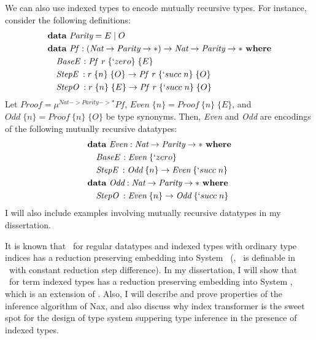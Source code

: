 We can also use indexed types to encode mutually recursive types.
For instance, consider the following definitions:
\begin{align*}
&\textbf{data}~ \textit{Parity} = E \mid O \\
&\textbf{data}~ \textit{Pf}\, : (\textit{Nat} -> \textit{Parity} -> *) ->
                                    \textit{Nat} -> \textit{Parity} -> *
  ~\textbf{where}\\
&\quad \textit{BaseE}\, : \textit{Pf}~\,r\;\{`zero\}\;\{E\} \\
&\quad \textit{StepE}\; : r\;\{n\}\;\{O\} -> \textit{Pf}~\,r\;\{`succ\;n\}\;\{O\} \\
&\quad \textit{StepO}\; : r\;\{n\}\;\{E\} -> \textit{Pf}~\,r\;\{`succ\;n\}\;\{O\}
\end{align*}
Let $\textit{Proof} = \mu^{\textit{Nat} -> \textit{Parity} -> *} \textit{Pf}$,
$\textit{Even}\;\{n\} = \textit{Proof}~\{n\}\;\{E\}$, and
$\textit{Odd}\;\{n\} = \textit{Proof}~\{n\}\;\{O\}$ be type synonyms.
Then, \textit{Even} and \textit{Odd} are encodings of the following
mutually recursive datatypes:
\begin{align*}
&\textbf{data}~\textit{Even} : \textit{Nat} -> \textit{Parity} -> *
 ~\textbf{where} \\
&\quad \textit{BaseE}\, : \textit{Even}\;\{`zero\}\\
&\quad \textit{StepE}\; : \textit{Odd}\;\{n\} -> \textit{Even}\;\{`succ\;n\} \\
&\textbf{data}~\textit{Odd} : \textit{Nat} -> \textit{Parity} -> *
 ~\textbf{where} \\
&\quad \textit{StepO}\; : \textit{Even}\;\{n\} -> \textit{Odd}\;\{`succ\;n\}
\end{align*}
I will also include examples involving mutually recursive datatypes
in my dissertation.

It is known that \MIt\ for regular datatypes and indexed types with ordinary
type indices has a reduction preserving embedding into System \Fw\ (\ie, \MIt\
is definable in \Fw\ with constant reduction step difference).
In my dissertation, I will show that \MIt\ for term indexed types has a
reduction preserving embedding into System \Fi, which is an extension of \Fw.
Also, I will describe and prove properties of the inference algorithm of Nax,
and also discuss why index transformer is the sweet spot for the design of
type system suppering type inference in the presence of indexed types.

